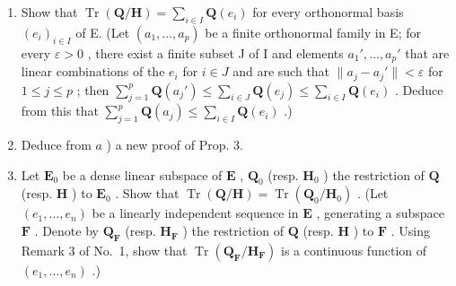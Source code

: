 \begin{enumerate}
\def\labelenumi{\alph{enumi})}
\item
  Show that \(\operatorname{Tr}(\mathbf{Q}/\mathbf{H}) = \sum_{i \in I} \mathbf{Q}(e_i)\) for every orthonormal basis \((e_i)_{i \in I}\) of E. (Let \((a_1, \ldots, a_p)\) be a finite orthonormal family in E; for every \(\varepsilon > 0\) , there exist a finite subset J of I and elements \(a_1', \ldots, a_p'\) that are linear combinations of the \(e_i\) for \(i \in J\) and are such that \(\|a_j - a_j' \| < \varepsilon\) for \(1 \leqslant j \leqslant p\) ; then \(\sum_{j=1}^{p} \mathbf{Q}(a_j') \leqslant \sum_{i \in J} \mathbf{Q}(e_j) \leqslant \sum_{i \in I} \mathbf{Q}(e_i)\) . Deduce from this that \(\sum_{j=1}^{p} \mathbf{Q}(a_j) \leqslant \sum_{i \in I} \mathbf{Q}(e_i)\) .)
\item
  Deduce from \(a\) ) a new proof of Prop. 3.
\item
  Let \(\mathbf{E}_0\) be a dense linear subspace of \(\mathbf{E}\) , \(\mathbf{Q}_0\) (resp. \(\mathbf{H}_0\) ) the restriction of \(\mathbf{Q}\) (resp. \(\mathbf{H}\) ) to \(\mathbf{E}_0\) . Show that \(\operatorname{Tr}(\mathbf{Q}/\mathbf{H}) = \operatorname{Tr}(\mathbf{Q}_0/\mathbf{H}_0)\) . (Let \((e_1, \ldots, e_n)\) be a linearly independent sequence in \(\mathbf{E}\) , generating a subspace \(\mathbf{F}\) . Denote by \(\mathbf{Q}_{\mathbf{F}}\) (resp. \(\mathbf{H}_{\mathbf{F}}\) ) the restriction of \(\mathbf{Q}\) (resp. \(\mathbf{H}\) ) to \(\mathbf{F}\) . Using Remark 3 of No.~1, show that \(\operatorname{Tr}(\mathbf{Q}_{\mathbf{F}}/\mathbf{H}_{\mathbf{F}})\) is a continuous function of \((e_1, \ldots, e_n)\) .)
\end{enumerate}

